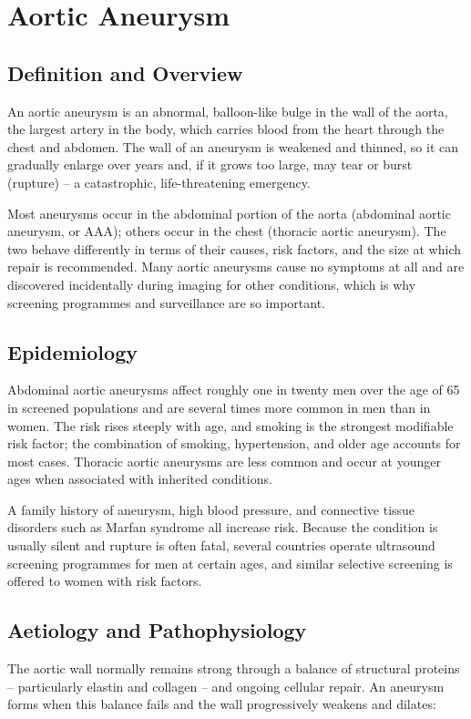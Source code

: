 \chapter{Aortic Aneurysm}

\section*{Definition and Overview}
An aortic aneurysm is an abnormal, balloon-like bulge in the wall of the aorta, the largest artery in the body, which carries blood from the heart through the chest and abdomen. The wall of an aneurysm is weakened and thinned, so it can gradually enlarge over years and, if it grows too large, may tear or burst (rupture) -- a catastrophic, life-threatening emergency.

Most aneurysms occur in the abdominal portion of the aorta (abdominal aortic aneurysm, or AAA); others occur in the chest (thoracic aortic aneurysm). The two behave differently in terms of their causes, risk factors, and the size at which repair is recommended. Many aortic aneurysms cause no symptoms at all and are discovered incidentally during imaging for other conditions, which is why screening programmes and surveillance are so important.

\section*{Epidemiology}
Abdominal aortic aneurysms affect roughly one in twenty men over the age of 65 in screened populations and are several times more common in men than in women. The risk rises steeply with age, and smoking is the strongest modifiable risk factor; the combination of smoking, hypertension, and older age accounts for most cases. Thoracic aortic aneurysms are less common and occur at younger ages when associated with inherited conditions.

A family history of aneurysm, high blood pressure, and connective tissue disorders such as Marfan syndrome all increase risk. Because the condition is usually silent and rupture is often fatal, several countries operate ultrasound screening programmes for men at certain ages, and similar selective screening is offered to women with risk factors.

\section*{Aetiology and Pathophysiology}
The aortic wall normally remains strong through a balance of structural proteins -- particularly elastin and collagen -- and ongoing cellular repair. An aneurysm forms when this balance fails and the wall progressively weakens and dilates:

